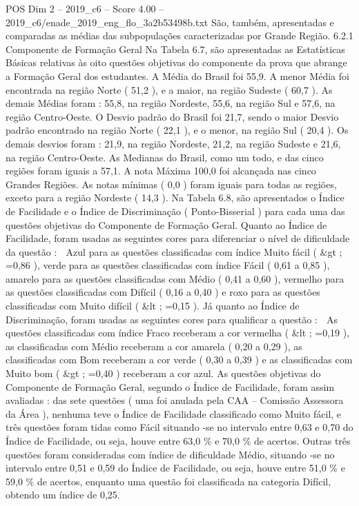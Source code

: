 \begin{textsample}{POS Dim 2 – 2019\_c6 – Score 4.00 – 2019\_c6/enade\_2019\_eng\_flo\_3a2b53498b.txt}
São, também, apresentadas e comparadas as médias das subpopulações caracterizadas por Grande Região. 6.2.1 Componente de Formação Geral Na Tabela 6.7, são apresentadas as Estatísticas Básicas relativas às oito questões objetivas do componente da prova que abrange a Formação Geral dos estudantes.
A Média do Brasil foi 55,9.
A menor Média foi encontrada na região Norte ( 51,2 ), e a maior, na região Sudeste ( 60,7 ).
As demais Médias foram : 55,8, na região Nordeste, 55,6, na região Sul e 57,6, na região Centro-Oeste.
O Desvio padrão do Brasil foi 21,7, sendo o maior Desvio padrão encontrado na região Norte ( 22,1 ), e o menor, na região Sul ( 20,4 ).
Os demais desvios foram : 21,9, na região Nordeste, 21,2, na região Sudeste e 21,6, na região Centro-Oeste.
As Medianas do Brasil, como um todo, e das cinco regiões foram iguais a 57,1.
A nota Máxima 100,0 foi alcançada nas cinco Grandes Regiões.
As notas mínimas ( 0,0 ) foram iguais para todas as regiões, exceto para a região Nordeste ( 14,3 ).
Na Tabela 6.8, são apresentados o Índice de Facilidade e o Índice de Discriminação ( Ponto-Bisserial ) para cada uma das questões objetivas do Componente de Formação Geral.
Quanto ao Índice de Facilidade, foram usadas as seguintes cores para diferenciar o nível de dificuldade da questão :  Azul para as questões classificadas com índice Muito fácil ( \&gt ; =0,86 ), verde para as questões classificadas com índice Fácil ( 0,61 a 0,85 ), amarelo para as questões classificadas com Médio ( 0,41 a 0,60 ), vermelho para as questões classificadas com Difícil ( 0,16 a 0,40 ) e roxo para as questões classificadas com Muito difícil ( \&lt ; =0,15 ).
Já quanto ao Índice de Discriminação, foram usadas as seguintes cores para qualificar a questão :  As questões classificadas com índice Fraco receberam a cor vermelha ( \&lt ; =0,19 ), as classificadas com Médio receberam a cor amarela ( 0,20 a 0,29 ), as classificadas com Bom receberam a cor verde ( 0,30 a 0,39 ) e as classificadas com Muito bom ( \&gt ; =0,40 ) receberam a cor azul.
As questões objetivas do Componente de Formação Geral, segundo o Índice de Facilidade, foram assim avaliadas : das sete questões ( uma foi anulada pela CAA – Comissão Assessora da Área ), nenhuma teve o Índice de Facilidade classificado como Muito fácil, e três questões foram tidas como Fácil situando -se no intervalo entre 0,63 e 0,70 do Índice de Facilidade, ou seja, houve entre 63,0 \% e 70,0 \% de acertos.
Outras três questões foram consideradas com índice de dificuldade Médio, situando -se no intervalo entre 0,51 e 0,59 do Índice de Facilidade, ou seja, houve entre 51,0 \% e 59,0 \% de acertos, enquanto uma questão foi classificada na categoria Difícil, obtendo um índice de 0,25.

\end{textsample}
